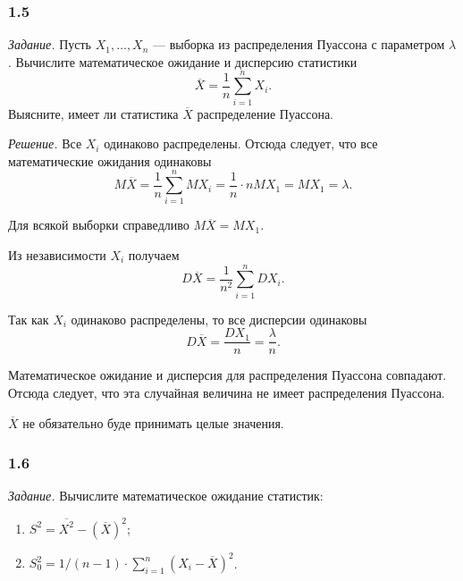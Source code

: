 \subsubsection{1.5}

\textit{Задание.}
Пусть $X_1, \dotsc, X_n$ --- выборка из распределения Пуассона с параметром $ \lambda $.
Вычислите математическое ожидание и дисперсию статистики
$$ \overline{X} =
  \frac{1}{n} \sum \limits_{i = 1}^n X_i.$$
Выясните, имеет ли статистика $ \overline{X}$ распределение Пуассона.

\textit{Решение.} Все $X_i$ одинаково распределены.
Отсюда следует, что все математические ожидания одинаковы
$$M \overline{X} =
  \frac{1}{n} \sum \limits_{i = 1}^n MX_i =
  \frac{1}{n} \cdot nMX_1 =
  MX_1 =
  \lambda.$$

Для всякой выборки справедливо $M \overline{X} = MX_1$.

Из независимости $X_i$ получаем
$$D \overline{X} =
  \frac{1}{n^2} \sum \limits_{i = 1}^n DX_i.$$

Так как $X_i$ одинаково распределены, то все дисперсии одинаковы
$$D \overline{X} =
  \frac{DX_1}{n} =
  \frac{ \lambda }{n}.$$

Математическое ожидание и дисперсия для распределения Пуассона совпадают.
Отсюда следует, что эта случайная величина не имеет распределения Пуассона.

$ \overline{X}$ не обязательно буде принимать целые значения.

\subsubsection{1.6}

\textit{Задание.} Вычислите математическое ожидание статистик:
\begin{enumerate}[label=\alph*)]
  \item $S^2 = \overline{X^2} - \left( \overline{X} \right)^2$;
  \item $S_0^2 =
          1 / \left( n - 1 \right) \cdot
          \sum \limits_{i = 1}^n \left( X_i - \overline{X} \right)^2$.
\end{enumerate}

